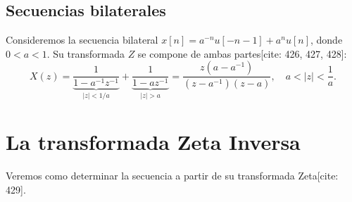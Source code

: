\documentclass[11pt,a4paper,openany]{book}
\begin{document}
\subsection{Secuencias bilaterales}
Consideremos la secuencia bilateral $x[n] = a^{-n} u[-n-1] + a^{n} u[n]$, donde $0<a<1$. Su transformada $Z$ se compone de ambas partes[cite: 426, 427, 428]:
\begin{equation}
	X(z) = \underbrace{\frac{1}{1-a^{-1} z^{-1}}}_{|z| < 1/a} + \underbrace{\frac{1}{1-a z^{-1}}}_{|z| > a} = \frac{z(a-a^{-1})}{(z-a^{-1})(z-a)}, \quad a < |z| < \frac{1}{a}.
\end{equation}

\section{La transformada Zeta Inversa}
Veremos como determinar la secuencia a partir de su transformada Zeta[cite: 429].
\end{document}
